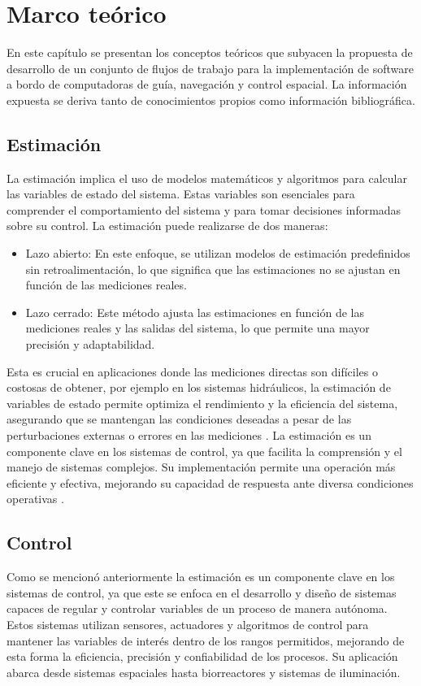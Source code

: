 \chapter{Marco teórico}
\label{ch:marco}

En este capítulo se presentan los conceptos teóricos que subyacen la propuesta de desarrollo de un conjunto de flujos de trabajo para la implementación de software 
a bordo de computadoras de guía, navegación y control espacial. La información expuesta se deriva tanto de conocimientos propios como información bibliográfica.

\section{Estimación}
La estimación implica el uso de modelos matemáticos y algoritmos para calcular las variables de estado del sistema. Estas variables son esenciales para comprender 
el comportamiento del sistema y para tomar decisiones informadas sobre su control. La estimación puede realizarse de dos maneras:

\begin{itemize}
    \item Lazo abierto: En este enfoque, se utilizan modelos de estimación predefinidos sin retroalimentación, lo que significa que las estimaciones no se ajustan en función
    de las mediciones reales.
    \item Lazo cerrado: Este método ajusta las estimaciones en función de las mediciones reales y las salidas del sistema, lo que permite una mayor precisión y adaptabilidad.
\end{itemize}

Esta es crucial en aplicaciones donde las mediciones directas son difíciles o costosas de obtener, por ejemplo en los sistemas hidráulicos, la estimación de variables de 
estado permite optimiza el rendimiento y la eficiencia del sistema, asegurando que se mantengan las condiciones deseadas a pesar de las perturbaciones externas o errores en las 
mediciones \cite{Merchn2019EvaluacinDM}. La estimación es un componente clave en los sistemas de control, ya que facilita la comprensión y el manejo de sistemas complejos. 
Su implementación permite una operación más eficiente y efectiva, mejorando su capacidad de respuesta ante diversa condiciones operativas \cite{Mesa2020EstimacinDV}.

\section{Control}
Como se mencionó anteriormente la estimación es un componente clave en los sistemas de control, ya que este se enfoca en el desarrollo y diseño de sistemas capaces de regular 
y controlar variables de un proceso de manera autónoma. Estos sistemas utilizan sensores, actuadores y algoritmos de control para mantener las variables de interés dentro de los 
rangos permitidos, mejorando de esta forma la eficiencia, precisión y confiabilidad de los procesos. Su aplicación abarca desde sistemas espaciales hasta biorreactores y sistemas
de iluminación. 


